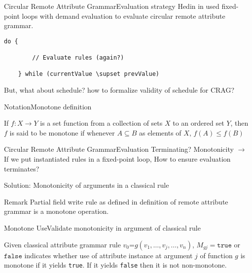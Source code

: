 \begin{frame}[fragile=singleslide]{Circular Remote Attribute Grammar}{Evaluation strategy}
Hedin in \cite{10.1016/j.scico.2005.06.005} used fixed-point loops with \alert{demand evaluation} to evaluate circular remote attribute grammar.

\begin{Verbatim}[fontsize=\small]
    do {
    
        // Evaluate rules (again?)
        
    } while (currentValue \supset prevValue)
\end{Verbatim}

\newlinevspace

But, what about \alert{schedule}? how to formalize validity of schedule for CRAG?
\end{frame}


\begin{frame}{Notation}{Monotone definition}

\begin{definition}
If $f:X \rightarrow Y$ is a \alert{set function} from a collection of sets $X$ to an ordered set $Y$, then $f$ is said to be monotone if whenever \alert{$A \subseteq B$} as elements of $X$, \alert{$f(A) \leq f(B)$}
\end{definition}

\end{frame}


\begin{frame}{Circular Remote Attribute Grammar}{Evaluation Terminating? Monotonicity}
$\to$ If we put instantiated rules in a fixed-point loop, How to \alert{ensure evaluation terminates}?

\newlinevspace

Solution: \alert{Monotonicity} of arguments in a classical rule

\newlinevspace

\begin{block}{Remark}
Partial field write rule as defined in definition of remote attribute grammar \alert{is a monotone operation}.
\end{block}
\end{frame}



\begin{frame}{Monotone Use}{Validate monotonicity in argument of classical rule}


\begin{definition}
Given classical attribute grammar rule $v_0 \texttt{=} g(v_1, \dots, v_j, \dots, v_n)$, $M_{g j} = \texttt{true}$ or $\texttt{false}$ indicates whether use of attribute instance at argument $j$ of function $g$ is monotone if it yields \texttt{true}. If it yields \texttt{false} then it is not non-monotone.
\end{definition}    
    
\end{frame}

